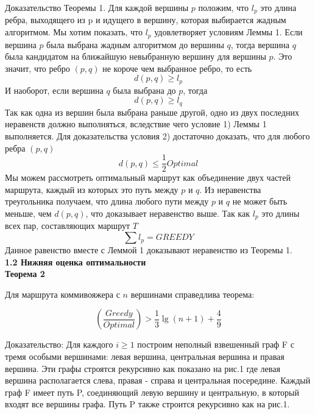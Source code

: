 \documentclass[a4paper, 14pt]{extarticle}
\begin{document}
Доказательство Теоремы 1. Для каждой  вершины $p$ положим, что $l_p$ это длина ребра, выходящего из p и идущего в вершину, которая выбирается жадным алгоритмом. Мы хотим показать, что $l_p$ удовлетворяет условиям Леммы 1. Если вершина $p$ была выбрана жадным алгоритмом до вершины $q$, тогда вершина $q$ была кандидатом на ближайшую невыбранную вершину для вершины $p$. Это значит, что ребро $(p,q)$ не короче чем выбранное ребро, то есть
\begin{equation}
d(p,q) \geq l_p
\end{equation}
И наоборот, если вершина $q$ была выбрана до $p$, тогда
\begin{equation}
d(p,q) \geq l_q
\end{equation}
Так как одна из вершин была выбрана раньше другой, одно из двух последних неравенств должно выполняться, вследствие чего  условие 1) Леммы 1 выполняется. Для доказательства условия 2) достаточно доказать, что для любого ребра $(p,q)$
\begin{equation}
d(p,q) \leq \frac{1}{2}Optimal
\end{equation}
Мы можем рассмотреть оптимальный маршрут как объединение двух частей маршрута, каждый из которых это путь между $p$ и $q$. Из неравенства треугольника получаем, что длина любого пути между $p$ и $q$ не может быть меньше, чем $d(p,q)$, что доказывает неравенство выше. Так как $l_p$ это длины всех пар, составляющих маршрут $T$
\begin{equation}
\sum l_p = GREEDY
\end{equation}
Данное равенство вместе с Леммой 1 доказывают неравенство из Теоремы 1.\\

\textbf{1.2 Нижняя оценка оптимальности}\\


\textbf{Теорема 2}

Для маршрута коммивояжера с $n$ вершинами справедлива теорема:

\begin{equation}
	(\frac{Greedy}{Optimal}) > \frac{1}{3}{\lg (n+1)} + \frac{4}{9}
\end{equation}

Доказательство:  Для каждого $i \geq 1 $ построим неполный взвешенный граф F с тремя особыми вершинами: левая вершина, центральная вершина и правая вершина. Эти графы строятся рекурсивно как показано на рис.1 где левая вершина располагается слева, правая - справа и центральная посередине. Каждый граф F имеет путь P, соединяющий левую вершину и центральную, в который входят все вершины графа. Путь P также строится рекурсивно как на рис.1. 
\end{document}
